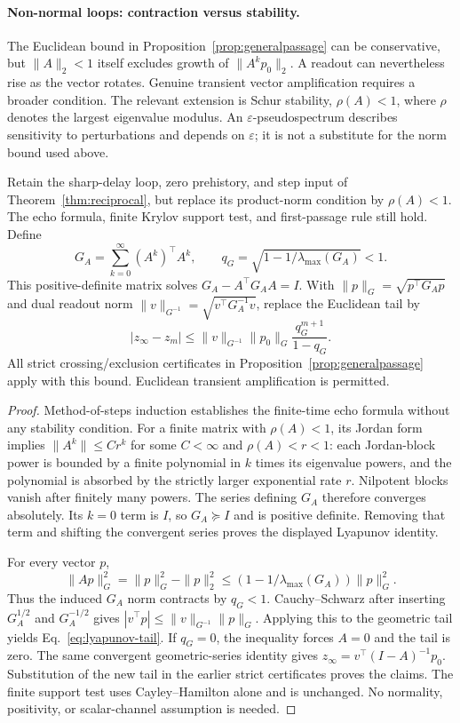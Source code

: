 \paragraph{Non-normal loops: contraction versus stability.} The Euclidean bound in Proposition~\ref{prop:generalpassage} can be conservative, but $\|A\|_2<1$ itself excludes growth of $\|A^kp_0\|_2$. A readout can nevertheless rise as the vector rotates. Genuine transient vector amplification requires a broader condition. The relevant extension is Schur stability, $\rho(A)<1$, where $\rho$ denotes the largest eigenvalue modulus. An $\varepsilon$-pseudospectrum describes sensitivity to perturbations and depends on $\varepsilon$; it is not a substitute for the norm bound used above.

\begin{proposition}\label{prop:stable-returns}
Retain the sharp-delay loop, zero prehistory, and step input of Theorem~\ref{thm:reciprocal}, but replace its product-norm condition by $\rho(A)<1$. The echo formula, finite Krylov support test, and first-passage rule still hold. Define
\[
G_A=\sum_{k=0}^{\infty}(A^k)^\top A^k,
\qquad q_G=\sqrt{1-1/\lambda_{\max}(G_A)}<1.
\]
This positive-definite matrix solves $G_A-A^\top G_AA=I$. With $\|p\|_G=\sqrt{p^\top G_Ap}$ and dual readout norm $\|v\|_{G^{-1}}=\sqrt{v^\top G_A^{-1}v}$, replace the Euclidean tail by
\begin{equation}
|z_\infty-z_m|\le
\|v\|_{G^{-1}}\|p_0\|_G\frac{q_G^{m+1}}{1-q_G}.
\label{eq:lyapunov-tail}
\end{equation}
All strict crossing/exclusion certificates in Proposition~\ref{prop:generalpassage} apply with this bound. Euclidean transient amplification is permitted.
\end{proposition}
\begin{proof}
Method-of-steps induction establishes the finite-time echo formula without any stability condition. For a finite matrix with $\rho(A)<1$, its Jordan form implies $\|A^k\|\le Cr^k$ for some $C<\infty$ and $\rho(A)<r<1$: each Jordan-block power is bounded by a finite polynomial in $k$ times its eigenvalue powers, and the polynomial is absorbed by the strictly larger exponential rate $r$. Nilpotent blocks vanish after finitely many powers. The series defining $G_A$ therefore converges absolutely. Its $k=0$ term is $I$, so $G_A\succeq I$ and is positive definite. Removing that term and shifting the convergent series proves the displayed Lyapunov identity.

For every vector $p$,
\[
\|Ap\|_G^2=\|p\|_G^2-\|p\|_2^2
\le(1-1/\lambda_{\max}(G_A))\|p\|_G^2.
\]
Thus the induced $G_A$ norm contracts by $q_G<1$. Cauchy--Schwarz after inserting $G_A^{1/2}$ and $G_A^{-1/2}$ gives $|v^\top p|\le\|v\|_{G^{-1}}\|p\|_G$. Applying this to the geometric tail yields Eq.~\eqref{eq:lyapunov-tail}. If $q_G=0$, the inequality forces $A=0$ and the tail is zero. The same convergent geometric-series identity gives $z_\infty=v^\top(I-A)^{-1}p_0$. Substitution of the new tail in the earlier strict certificates proves the claims. The finite support test uses Cayley--Hamilton alone and is unchanged. No normality, positivity, or scalar-channel assumption is needed.
\end{proof}

